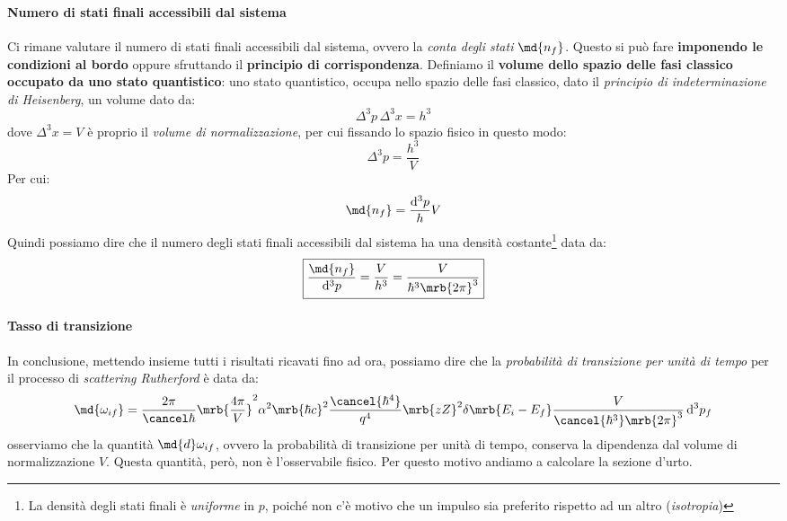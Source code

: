 \paragraph{Numero di stati finali accessibili dal sistema}
Ci rimane valutare il numero di stati finali accessibili dal sistema, ovvero la
\textit{conta degli stati} $\md{n_f}$.
Questo si può fare \textbf{imponendo le condizioni al bordo} oppure sfruttando
il \textbf{principio di corrispondenza}. Definiamo il \textbf{volume dello
spazio delle fasi classico occupato da uno stato quantistico}: uno stato
quantistico, occupa nello spazio delle fasi classico, dato il \textit{principio
di indeterminazione di Heisenberg}, un volume dato da:
\begin{equation}
  \boxed{\Delta^3p \, \Delta^3x = h^3}
\end{equation}
dove $\Delta^3x = V$ è proprio il \textit{volume di normalizzazione}, per cui
fissando lo spazio fisico in questo modo:
\begin{equation}
  \Delta^3p = \frac{h^3}{V}
\end{equation}
Per cui:
\begin{equation}
  \md{n_f} = \frac{\mathrm{d}^3p}{h}V
\end{equation}
Quindi possiamo dire che il numero degli stati finali accessibili dal sistema
ha una densità costante\footnote{
  La densità degli stati finali è \textit{uniforme} in $p$, poiché non c'è
  motivo che un impulso sia preferito rispetto ad un altro (\textit{isotropia})
} data da:
\begin{equation}
  \boxed{
    \frac{\md{n_f}}{\mathrm{d}^3p} = \frac{V}{h^3} = \frac{V}{\hbar^3
    \mrb{2\pi}^3}
  }
\end{equation}

\paragraph{Tasso di transizione}
In conclusione, mettendo insieme tutti i risultati ricavati fino ad ora,
possiamo dire che la \textit{probabilità di transizione per unità di tempo} per
il processo di \textit{scattering Rutherford} è data da:
\begin{equation}
  \md{\omega_{if}} = \frac{2\pi}{\cancel\hbar} \mrb{\frac{4\pi}{V}}^2 \alpha^2
  \mrb{\hbar c}^2 \frac{\cancel{\hbar^4}}{q^4} \mrb{zZ}^2
  \delta\mrb{E_i - E_f} \frac{V}{\cancel{\hbar^3} \mrb{2\pi}^3} \,
  \mathrm{d}^3p_f
  \label{eq:prob_transizione_unita_tempo}
\end{equation}
osserviamo che la quantità $\md{d}\omega_{if}$, ovvero la probabilità di
transizione per unità di tempo, conserva la dipendenza dal volume di
normalizzazione $V$. Questa quantità, però, non è l'osservabile fisico. Per
questo motivo andiamo a calcolare la sezione d'urto.


